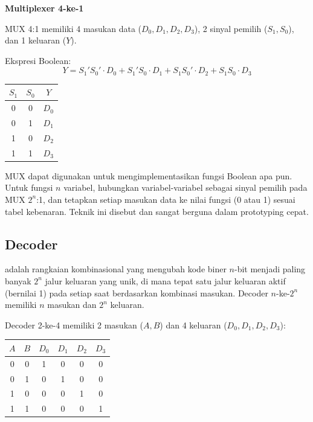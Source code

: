 \begin{contoh}
\textbf{Multiplexer 4-ke-1}

MUX 4:1 memiliki 4 masukan data ($D_0, D_1, D_2, D_3$), 2 sinyal pemilih ($S_1, S_0$), dan 1 keluaran ($Y$).

Ekspresi Boolean:
\[ Y = S_1'S_0' \cdot D_0 + S_1'S_0 \cdot D_1 + S_1 S_0' \cdot D_2 + S_1 S_0 \cdot D_3 \]

\begin{center}
\renewcommand{\arraystretch}{1.2}
\begin{tabular}{|c|c||c|}
\hline
$S_1$ & $S_0$ & $Y$ \\ \hline
0 & 0 & $D_0$ \\ \hline
0 & 1 & $D_1$ \\ \hline
1 & 0 & $D_2$ \\ \hline
1 & 1 & $D_3$ \\ \hline
\end{tabular}
\end{center}
\end{contoh}

\begin{konsep}
MUX dapat digunakan untuk mengimplementasikan fungsi Boolean apa pun. Untuk fungsi $n$ variabel, hubungkan variabel-variabel sebagai sinyal pemilih pada MUX $2^n$:1, dan tetapkan setiap masukan data ke nilai fungsi (0 atau 1) sesuai tabel kebenaran. Teknik ini disebut  dan sangat berguna dalam prototyping cepat.
\end{konsep}

\subsection{Decoder}

\begin{definisi}[Decoder]
 adalah rangkaian kombinasional yang mengubah kode biner $n$-bit menjadi paling banyak $2^n$ jalur keluaran yang unik, di mana tepat satu jalur keluaran aktif (bernilai 1) pada setiap saat berdasarkan kombinasi masukan. Decoder $n$-ke-$2^n$ memiliki $n$ masukan dan $2^n$ keluaran.
\end{definisi}

Decoder 2-ke-4 memiliki 2 masukan ($A, B$) dan 4 keluaran ($D_0, D_1, D_2, D_3$):

\begin{center}
\renewcommand{\arraystretch}{1.2}
\begin{tabular}{|c|c||c|c|c|c|}
\hline
$A$ & $B$ & $D_0$ & $D_1$ & $D_2$ & $D_3$ \\ \hline
0 & 0 & 1 & 0 & 0 & 0 \\ \hline
0 & 1 & 0 & 1 & 0 & 0 \\ \hline
1 & 0 & 0 & 0 & 1 & 0 \\ \hline
1 & 1 & 0 & 0 & 0 & 1 \\ \hline
\end{tabular}
\end{center}

